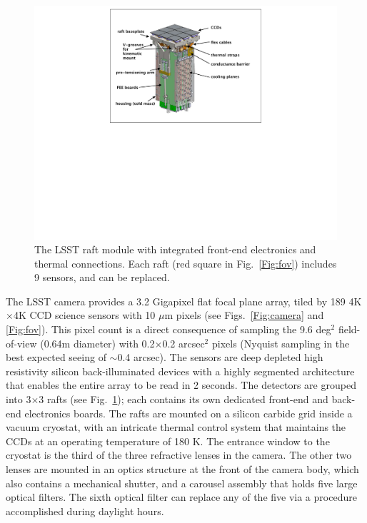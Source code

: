 \documentclass{emulateapj}
\begin{document}
\begin{figure}[ht]
\hskip -1.6in
\includegraphics[width=1.5\hsize,angle=90.0,clip]{raft.pdf}
\vskip -2.5in
\caption{The LSST raft module with integrated front-end electronics
and thermal connections. Each raft (red square in Fig.~\ref{Fig:fov})
includes 9 sensors, and can be replaced.} 
\label{Fig:raft}
\end{figure}



The LSST camera provides a 3.2 Gigapixel flat focal plane array, tiled by 189
4K$\times$4K CCD science sensors with 10 $\mu$m pixels (see Figs.~\ref{Fig:camera}
and \ref{Fig:fov}). This pixel count is a direct consequence of sampling the 
9.6 deg$^2$ field-of-view (0.64m diameter) with 0.2$\times$0.2 arcsec$^2$
pixels (Nyquist sampling in the best expected seeing of $\sim$0.4 arcsec). 
The sensors are deep depleted high resistivity silicon back-illuminated devices with a highly segmented 
architecture that enables the entire array to be read in 2 seconds. 
The detectors are grouped into 3$\times$3 rafts (see Fig.~\ref{Fig:raft}); each 
contains its own dedicated front-end and back-end 
electronics boards. The rafts are mounted on a silicon carbide grid inside a 
vacuum cryostat, with an intricate thermal control system that maintains the
CCDs at an operating temperature of 180 K. The entrance window to the
cryostat is the third of the three refractive lenses in the camera. The other
two lenses are mounted in an optics structure at the front of the camera body, which 
also contains a mechanical shutter, and a carousel assembly that holds five
large optical filters. The sixth optical filter can 
replace any of the five via a procedure accomplished during daylight hours. 
\end{document}
